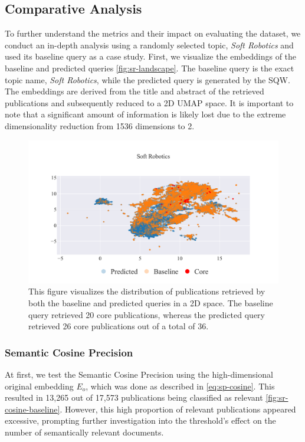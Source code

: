 \subsection{Comparative Analysis}

To further understand the metrics and their impact on evaluating the dataset, we conduct an in-depth analysis using a randomly selected topic, \textit{Soft Robotics} and used its baseline query as a case study. First, we visualize the embeddings of the baseline and predicted queries \autoref{fig:sr-landscape}. The baseline query is the exact topic name, \textit{Soft Robotics}, while the predicted query is generated by the SQW. The embeddings are derived from the title and abstract of the retrieved publications and subsequently reduced to a 2D UMAP \autocite{mcinnes2020umap} space. It is important to note that a significant amount of information is likely lost due to the extreme dimensionality reduction from 1536 dimensions to 2.


\begin{figure}[!ht]
	\centering	
	\includegraphics[scale=0.7]{pics/sr-landscape.pdf}
	\caption[Embedding of Soft Robotics]{This figure visualizes the distribution of publications retrieved by both the baseline and predicted queries in a 2D space. The baseline query retrieved 20 core publications, whereas the predicted query retrieved 26 core publications out of a total of 36.}\label{fig:sr-landscape}
\end{figure}

\subsubsection{Semantic Cosine Precision}
At first, we test the Semantic Cosine Precision using the high-dimensional original embedding $E_o$, which was done as described in \autoref{eq:sp-cosine}. This resulted in 13,265 out of 17,573 publications being classified as relevant \autoref{fig:sr-cosine-baseline}. However, this high proportion of relevant publications appeared excessive, prompting further investigation into the threshold's effect on the number of semantically relevant documents.

